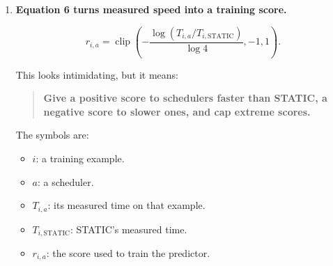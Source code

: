 \documentclass[11pt,a4paper]{article}
\providecommand{\tightlist}{\setlength{\itemsep}{0pt}\setlength{\parskip}{3pt}}
\begin{document}
\begin{enumerate}
  The superscript \({}^\top\), called ``transpose,'' just arranges the list as a column for matrix calculations.

  \textbf{Why logarithms?} Job sizes and times can vary by large factors. A logarithm puts multiplication onto a manageable scale.

  For example:

  \[
  \log_2 2=1,\qquad
  \log_2 4=2,\qquad
  \log_2 8=3.
  \]

  Every doubling increases the logged value by one.

  \(L_0\) and \(V_0\) answer related questions: ``Did some threads finish much earlier than others?'' If so, there may be an opportunity for a different scheduler to distribute work better.

  The code computes imbalance as:

  \[
  L=1-\frac{\text{average thread finish time}}
                   {\text{latest thread finish time}},
  \]

  and variation as:

  \[
  V=
  \frac{\text{standard deviation of thread finish times}}
       {\text{average thread finish time}}.
  \]

  If all threads finish together, both are zero. Larger values indicate more uneven finishing.

  The nonconstant features are also \textbf{standardized} using training data: subtract the training average, then divide by the training standard deviation. This prevents features with large numerical values from dominating just because of their units.
\item
  \textbf{Equation 6 turns measured speed into a training score.}

  \[
  r_{i,a}
  =
  \operatorname{clip}
  \left(
  -\frac{\log(T_{i,a}/T_{i,\mathrm{STATIC}})}{\log4},
  -1,1
  \right).
  \]

  This looks intimidating, but it means:

  \begin{quote}
  \textbf{Give a positive score to schedulers faster than STATIC, a negative score to slower ones, and cap extreme scores.}
  \end{quote}

  The symbols are:

  \begin{itemize}
  \tightlist
  \item
    \(i\): a training example.
  \item
    \(a\): a scheduler.
  \item
    \(T_{i,a}\): its measured time on that example.
  \item
    \(T_{i,\mathrm{STATIC}}\): STATIC's measured time.
  \item
    \(r_{i,a}\): the score used to train the predictor.
  \end{itemize}


\end{enumerate}
\end{document}
